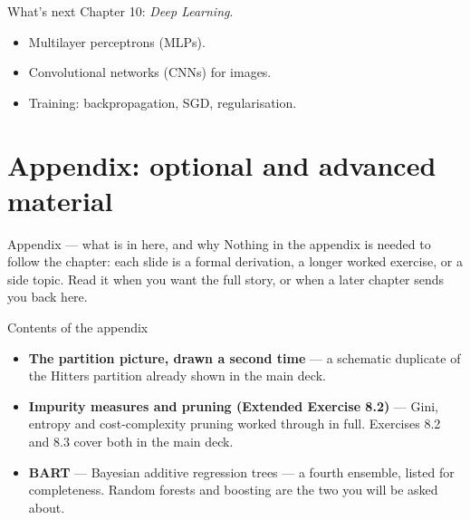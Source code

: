 \documentclass[aspectratio=169,11pt]{beamer}
\begin{document}
\begin{frame}{What's next}
  Chapter 10: \emph{Deep Learning}.
  \begin{itemize}
    \item Multilayer perceptrons (MLPs).
    \item Convolutional networks (CNNs) for images.
    \item Training: backpropagation, SGD, regularisation.
  \end{itemize}
\end{frame}


\appendix
\AtBeginSection[]{}
\section{Appendix: optional and advanced material}

\begin{frame}{Appendix --- what is in here, and why}
  \small
  Nothing in the appendix is needed to follow the chapter: each slide is a
  formal derivation, a longer worked exercise, or a side topic. Read it when
  you want the full story, or when a later chapter sends you back here.
  \begin{block}{Contents of the appendix}
    \begin{itemize}
      \item \textbf{The partition picture, drawn a second time} --- a schematic duplicate of the Hitters partition already shown in the main deck.
      \item \textbf{Impurity measures and pruning (Extended Exercise 8.2)} --- Gini, entropy and cost-complexity pruning worked through in full. Exercises 8.2 and 8.3 cover both in the main deck.
      \item \textbf{BART} --- Bayesian additive regression trees --- a fourth ensemble, listed for completeness. Random forests and boosting are the two you will be asked about.
    \end{itemize}
  \end{block}
\end{frame}
\end{document}
